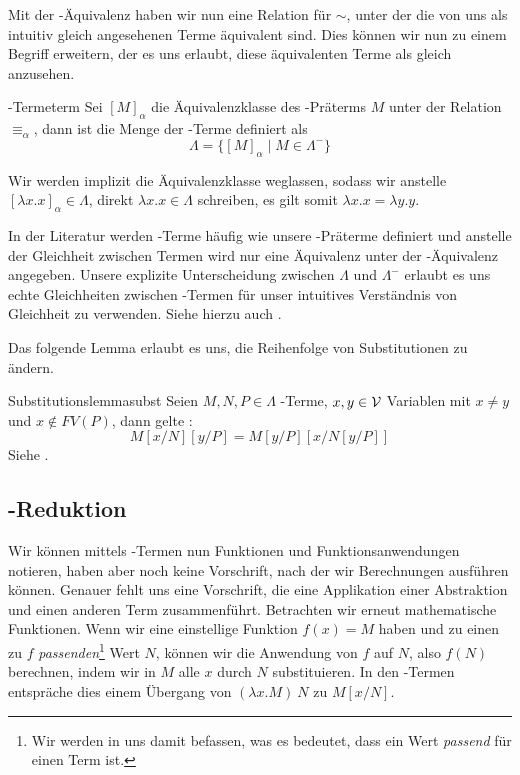 Mit der \talpha-Äquivalenz haben wir nun eine Relation für $\sim$, unter der die von uns als intuitiv gleich angesehenen Terme äquivalent sind. Dies können wir nun zu einem Begriff erweitern, der es uns erlaubt, diese äquivalenten Terme als gleich anzusehen.

\begin{definition}{\tlambda-Terme}{term}
    Sei $[M]_\alpha$ die Äquivalenzklasse des \tlambda-Präterms $M$ unter der Relation $\equiv_\alpha$, dann ist die Menge der \tlambda-Terme \tLambda{} definiert als
    \[\Lambda=\{[M]_\alpha\mid M\in\Lambda^-\}\]
\end{definition}
\begin{notation}
Wir werden implizit die Äquivalenzklasse weglassen, sodass wir anstelle $[\lambda x.x]_\alpha\in\Lambda$,
direkt $\lambda x.x\in\Lambda$ schreiben, es gilt somit $\lambda x.x = \lambda y.y$.
\end{notation}
\begin{remark}
    In der Literatur werden \tlambda-Terme häufig wie unsere \tlambda-Präterme definiert und anstelle der Gleichheit zwischen Termen wird nur eine Äquivalenz unter der \talpha-Äquivalenz angegeben. Unsere explizite Unterscheidung zwischen $\Lambda$ und $\Lambda^-$ erlaubt es uns echte Gleichheiten zwischen \tlambda-Termen für unser intuitives Verständnis von Gleichheit zu verwenden. Siehe hierzu auch \cite{lecturesCH}.
\end{remark}

Das folgende Lemma erlaubt es uns, die Reihenfolge von Substitutionen zu ändern.

\begin{lemma}{Substitutionslemma}{subst}
    Seien $M, N, P\in\Lambda$ \tlambda-Terme, $x, y\in\mathcal{V}$ Variablen mit $x\neq y$ und $x\notin FV(P)$, dann gelte :
    \[M[x/N][y/P]=M[y/P][x/N[y/P]]\]
    \Proof
    Siehe \cite{lecturesCH}.
\end{lemma}


\subsection{\tbeta-Reduktion}
Wir können mittels \tlambda-Termen nun Funktionen und Funktionsanwendungen notieren, haben aber noch keine Vorschrift, nach der wir Berechnungen ausführen können. Genauer fehlt uns eine Vorschrift, die eine Applikation einer Abstraktion und einen anderen Term zusammenführt. Betrachten wir erneut mathematische Funktionen. Wenn wir eine einstellige Funktion $f(x) = M$ haben und zu einen zu $f$ \emph{passenden}\footnote{Wir werden in  uns damit befassen, was es bedeutet, dass ein Wert \emph{passend} für einen Term ist.} Wert $N$, können wir die Anwendung von $f$ auf $N$, also $f(N)$ berechnen, indem wir in $M$ alle $x$ durch $N$ substituieren. In den \tlambda-Termen entspräche dies einem Übergang von $(\lambda x.M)~N$ zu $M[x/N]$. 

